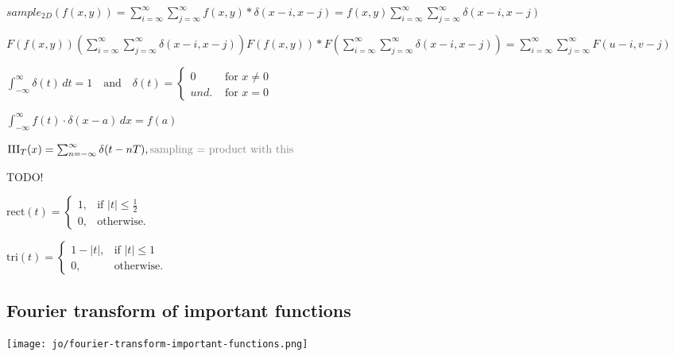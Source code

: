 
$sample_{2D} (f(x, y)) = \sum_{i = \infty}^{\infty} \sum_{j = \infty}^{\infty} f(x, y) * \delta(x - i, x - j) = f(x, y) \sum_{i = \infty}^{\infty}\sum_{j = \infty}^{\infty}\delta(x - i, x - j)$


$ F(f(x, y))  (\sum_{i = \infty}^{\infty}\sum_{j = \infty}^{\infty}\delta(x - i, x - j)) F(f(x, y)) * F( \sum_{i = \infty}^{\infty}\sum_{j = \infty}^{\infty}\delta(x - i, x - j)) =  \sum_{i = \infty}^{\infty}\sum_{j = \infty}^{\infty} F(u - i, v - j)$


$\int_{-\infty}^{\infty} \delta(t) \, dt = 1 \quad \text{and} \quad \delta(t) =  \begin{cases} 0 & \text{ for } x \neq 0 \\ und. & \text{ for } x = 0 \end{cases}$


\color{black} 
$\int_{-\infty}^{\infty} f(t) \cdot \delta(x - a) \, dx = f(a)$


$\text{III}_T(x) = \sum_{n=-\infty}^{\infty} \delta(t - nT),\\ \color{gray} \text{sampling = product with this}$

TODO!

$\text{rect}(t) = \begin{cases} 1, & \text{if } |t| \leq \frac{1}{2} \\ 0, & \text{otherwise.} \end{cases}$

$\text{tri}(t) = \begin{cases} 1 - |t|, & \text{if } |t| \leq 1 \\ 0, & \text{otherwise.} \end{cases}$

\subsection*{Fourier transform of important functions}
\texttt{[image: jo/fourier-transform-important-functions.png]}
